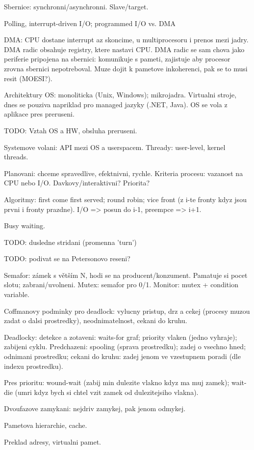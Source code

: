 Sbernice: synchronni/asynchronni. Slave/target.

Polling, interrupt-driven I/O; programmed I/O vs. DMA

DMA: CPU dostane interrupt az skoncime, u multiprocesoru i prenos mezi jadry.
DMA radic obsahuje registry, ktere nastavi CPU.
DMA radic se sam chova jako periferie pripojena na sbernici: komunikuje s
pameti, zajistuje aby procesor zrovna sbernici nepotreboval.
Muze dojit k pametove inkoherenci, pak se to musi resit (MOESI?).

Architektury OS: monoliticka (Unix, Windows); mikrojadra.
Virtualni stroje, dnes se pouziva napriklad pro managed jazyky (.NET, Java).
OS se vola z aplikace pres preruseni.

TODO: Vztah OS a HW, obsluha preruseni.

Systemove volani: API mezi OS a userspacem.
Thready: user-level, kernel threads.

Planovani: chceme spravedlive, efektnivni, rychle.
Kriteria procesu: vazanost na CPU nebo I/O. Davkovy/interaktivni? Priorita?

Algoritmy: first come first served; round robin; vice front (z i-te fronty
kdyz jsou prvni i fronty prazdne). I/O => posun do i-1, preempce => i+1.

Busy waiting.

TODO: dusledne stridani (promenna 'turn')

TODO: podivat se na Petersonovo reseni?

Semafor: zámek s větším N, hodi se na producent/konzument. Pamatuje si
pocet slotu; zabrani/uvolneni.
Mutex: semafor pro 0/1.
Monitor: mutex + condition variable.

Coffmanovy podminky pro deadlock: vylucny pristup, drz a cekej (procesy
muzou zadat o dalsi prostredky), neodnimatelnost, cekani do kruhu.

Deadlocky: detekce a zotaveni: waits-for graf; priority vlaken (jedno vyhraje);
zabijeni cyklu. Predchazeni: spooling (sprava prostredku); zadej o vsechno hned;
odnimani prostredku; cekani do kruhu: zadej jenom ve vzestupnem poradi (dle
indexu prostredku).

Pres prioritu: wound-wait (zabij min dulezite vlakno kdyz ma muj zamek);
wait-die (umri kdyz bych si chtel vzit zamek od dulezitejsiho vlakna).

Dvoufazove zamykani: nejdriv zamykej, pak jenom odmykej.

Pametova hierarchie, cache.

Preklad adresy, virtualni pamet.

